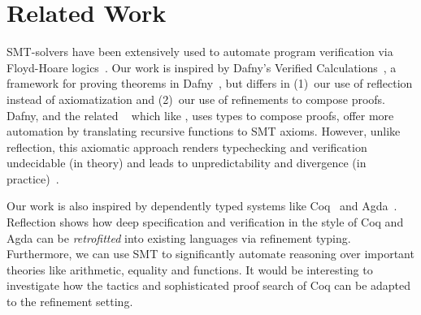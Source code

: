 \section{Related Work}\label{sec:related}


%
SMT-solvers have been extensively used to automate
program verification via Floyd-Hoare logics~\cite{Nelson81}.
%
Our work is inspired by Dafny's Verified
Calculations~\citep{LeinoPolikarpova16},
a framework for proving theorems in
Dafny~\citep{dafny}, but differs in
%
(1)~our use of reflection instead of axiomatization and
(2)~our use of refinements to compose proofs.
%
Dafny, and the related \fstar~\citep{fstar}
which like \toolname, uses types to compose
proofs, offer more automation by translating
recursive functions to SMT axioms.
However, unlike reflection, this axiomatic
approach renders typechecking and verification
undecidable (in theory) and leads to
unpredictability and divergence
(in practice)~\citep{Leino16}.




%
Our work is also inspired by dependently typed
systems like Coq~\citep{coq-book} and
Agda~\citep{agda}.
%
Reflection shows how deep specification
and verification in the style of Coq and Agda
can be \emph{retrofitted} into existing languages
via refinement typing.
%
Furthermore, we can use SMT to significantly
automate reasoning over important theories like
arithmetic, equality and functions.
%
It would be interesting to investigate how
the tactics and sophisticated proof search
of Coq \etc can be adapted to the refinement setting.

